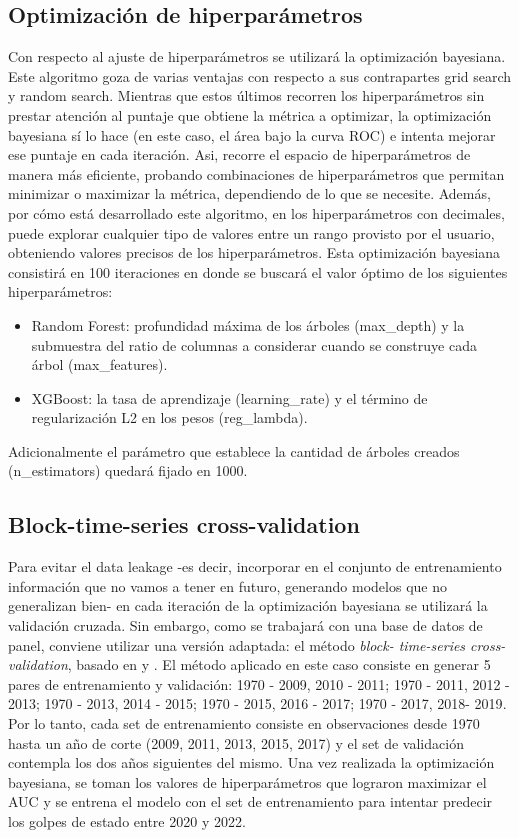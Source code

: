 \documentclass{article}
\begin{document}
\subsection{Optimización de hiperparámetros}
Con respecto al ajuste de hiperparámetros se utilizará la optimización bayesiana. Este
algoritmo goza de varias ventajas con respecto a sus contrapartes grid search y random
search. Mientras que estos últimos recorren los hiperparámetros
sin prestar atención al puntaje que obtiene la métrica a optimizar, la optimización bayesiana
sí lo hace (en este caso, el área bajo la curva ROC) e intenta mejorar ese puntaje en cada iteración. 
Asi, recorre el espacio de hiperparámetros de manera más eficiente,
probando combinaciones de hiperparámetros que permitan minimizar o maximizar la métrica, dependiendo
de lo que se necesite.
Además, por cómo está desarrollado este algoritmo, en los hiperparámetros con decimales, puede
explorar cualquier tipo de valores entre un rango provisto por el usuario, obteniendo valores
precisos de los hiperparámetros. Esta optimización bayesiana consistirá en 100 
iteraciones en donde se buscará el valor óptimo de los siguientes hiperparámetros:

\begin{itemize}
 \item Random Forest: profundidad máxima de los árboles (max\_depth) y la 
 submuestra del ratio de columnas a considerar cuando se construye cada árbol 
 (max\_features).
 \item XGBoost: la tasa de aprendizaje (learning\_rate) y el término de 
 regularización L2 en los pesos (reg\_lambda).
\end{itemize}

Adicionalmente el parámetro que establece la cantidad de árboles creados 
(n\_estimators) quedará fijado en 1000.

\subsection{Block-time-series cross-validation}
Para evitar el data leakage -es decir, incorporar en el conjunto de entrenamiento
información que no vamos a tener en futuro, generando modelos que no generalizan bien- 
en cada iteración de la optimización bayesiana
se utilizará la validación cruzada. Sin embargo, como se trabajará con una base
de datos de panel, conviene utilizar una versión adaptada: el método \textit{block-
time-series cross-validation}, basado en \cite{Bur94} y \cite{RAc00}. El método 
aplicado en este caso consiste en generar 5 pares de entrenamiento y validación: 
{1970 - 2009, 2010 - 2011}; {1970 - 2011, 2012 - 2013}; {1970 - 2013, 2014 - 2015}; 
{1970 - 2015, 2016 - 2017}; {1970 - 2017, 2018- 2019}. Por lo tanto, cada set de 
entrenamiento consiste en observaciones desde 1970 hasta un año de corte (2009, 
2011, 2013, 2015, 2017) y el set de validación contempla los dos años siguientes 
del mismo. Una vez realizada la optimización bayesiana, se toman los valores de 
hiperparámetros que lograron maximizar el AUC y se entrena el modelo con el set de 
entrenamiento para intentar predecir los golpes de estado entre 2020 y 2022. 
\end{document}
